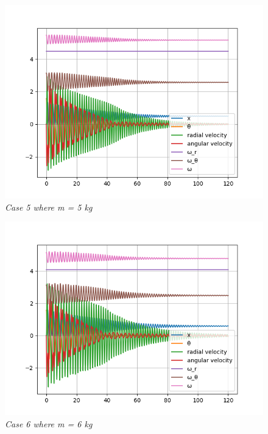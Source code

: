 \begin{figure}[H]
    \centering
    \includegraphics[width=15cm]{SimPictures/m5.png}
    \caption{\textit{Case 5 where m = 5 kg}}
    \label{}
\end{figure}
        
\begin{figure}[H]
    \centering
    \includegraphics[width=15cm]{SimPictures/m6.png}
    \caption{\textit{Case 6 where m = 6 kg}}
    \label{}
\end{figure}
        
